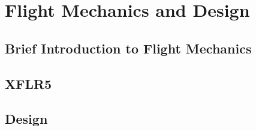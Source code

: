 
\chapter{Flight Mechanics and Design} \label{chap:4}


\section{Brief Introduction to Flight Mechanics}


\section{XFLR5}

\section{Design}




